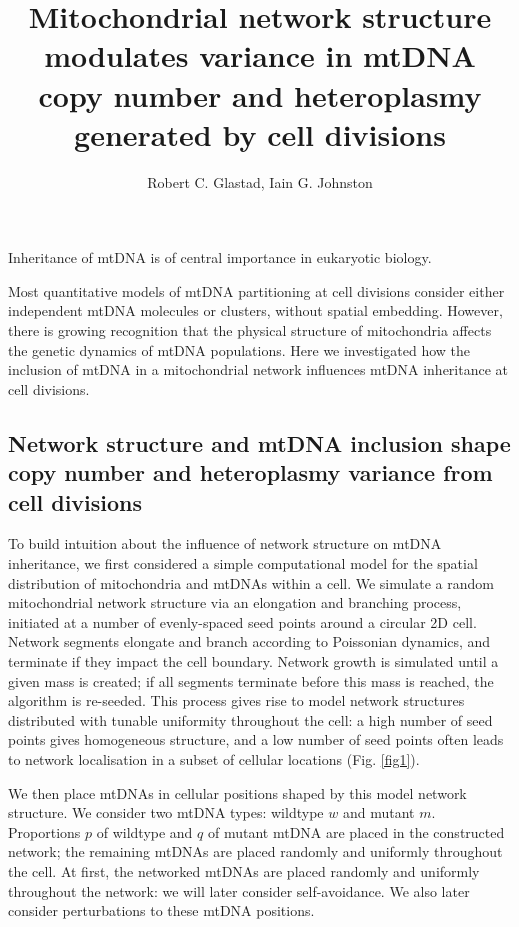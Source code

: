 \documentclass{article}
\title{Mitochondrial network structure modulates variance in mtDNA copy number and heteroplasmy generated by cell divisions}
\author{Robert C. Glastad, Iain G. Johnston}
\date{}
\begin{document}
\maketitle

Inheritance of mtDNA is of central importance in eukaryotic biology.

Most quantitative models of mtDNA partitioning at cell divisions consider either independent mtDNA molecules or clusters, without spatial embedding. However, there is growing recognition that the physical structure of mitochondria affects the genetic dynamics of mtDNA populations. Here we investigated how the inclusion of mtDNA in a mitochondrial network influences mtDNA inheritance at cell divisions.



\subsection*{Network structure and mtDNA inclusion shape copy number and heteroplasmy variance from cell divisions}

To build intuition about the influence of network structure on mtDNA inheritance, we first considered a simple computational model for the spatial distribution of mitochondria and mtDNAs within a cell. We simulate a random mitochondrial network structure via an elongation and branching process, initiated at a number of evenly-spaced seed points around a circular 2D cell. Network segments elongate and branch according to Poissonian dynamics, and terminate if they impact the cell boundary. Network growth is simulated until a given mass is created; if all segments terminate before this mass is reached, the algorithm is re-seeded. This process gives rise to model network structures distributed with tunable uniformity throughout the cell: a high number of seed points gives homogeneous structure, and a low number of seed points often leads to network localisation in a subset of cellular locations (Fig. \ref{fig1}).

We then place mtDNAs in cellular positions shaped by this model network structure. We consider two mtDNA types: wildtype $w$ and mutant $m$. Proportions $p$ of wildtype and $q$ of mutant mtDNA are placed in the constructed network; the remaining mtDNAs are placed randomly and uniformly throughout the cell. At first, the networked mtDNAs are placed randomly and uniformly throughout the network: we will later consider self-avoidance. We also later consider perturbations to these mtDNA positions.
\end{document}
